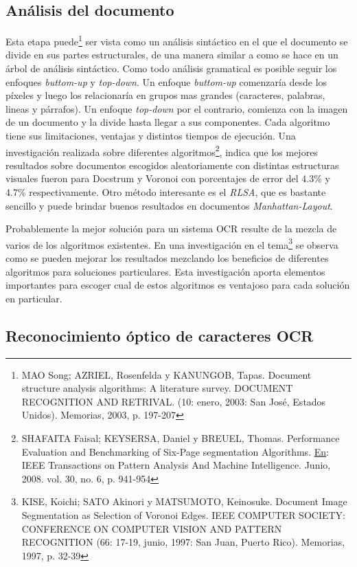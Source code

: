\documentclass[a4paper, 11pt, oneside]{report}
\begin{document}
\subsection{Análisis del documento}

Esta etapa puede\footnote{MAO Song; AZRIEL, Rosenfelda y KANUNGOB, Tapas. Document structure analysis algorithms: A literature survey. DOCUMENT RECOGNITION AND RETRIVAL. (10: enero, 2003: San José, Estados Unidos).  Memorias, 2003, p. 197-207} ser vista como un análisis sintáctico en el que el documento se divide en sus partes estructurales, de una manera similar a como se hace en un árbol de análisis sintáctico. Como todo análisis gramatical es posible seguir los enfoques \textit{buttom-up} y \textit{top-down}. Un enfoque \textit{buttom-up} comenzaría desde los píxeles y luego los relacionaría en grupos mas grandes (caracteres, palabras, lineas y párrafos). Un enfoque \textit{top-down} por el contrario, comienza con la imagen de un documento y la divide hasta llegar a sus componentes. Cada algoritmo tiene sus limitaciones, ventajas y distintos tiempos de ejecución. Una investigación realizada sobre diferentes algoritmos\footnote{SHAFAITA Faisal; KEYSERSA,  Daniel y BREUEL, Thomas. Performance Evaluation and Benchmarking of Six-Page segmentation Algorithms. \underline{En}: IEEE Transactions on Pattern Analysis And Machine Intelligence.  Junio, 2008. vol. 30, no. 6, p. 941-954}, indica que los mejores resultados sobre documentos escogidos aleatoriamente con distintas estructuras visuales fueron para Docstrum y Voronoi con porcentajes de error del 4.3\% y 4.7\% respectivamente. Otro método interesante es el \textit{RLSA}, que es bastante sencillo y puede brindar buenos resultados en documentos \textit{Manhattan-Layout}. 

Probablemente la mejor solución para un sistema OCR resulte de la mezcla de varios de los algoritmos existentes. En una investigación en el tema\footnote{KISE, Koichi; SATO Akinori y MATSUMOTO,  Keinosuke. Document Image Segmentation as Selection of Voronoi Edges. IEEE COMPUTER SOCIETY: CONFERENCE ON COMPUTER VISION AND PATTERN RECOGNITION (66: 17-19, junio, 1997: San Juan,  Puerto Rico). Memorias, 1997, p. 32-39} se observa como se pueden mejorar los resultados mezclando los beneficios de diferentes algoritmos para soluciones particulares. Esta investigación aporta elementos importantes para escoger cual de estos algoritmos es ventajoso para cada solución en particular.  

\subsection{Reconocimiento óptico de caracteres OCR}
\end{document}
